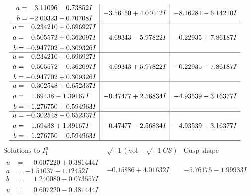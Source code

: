 \documentclass[1p]{elsarticle_modified}
\theoremstyle{definition}
\newcommand{\I}{\sqrt{-1}}
\begin{document}
$$\begin{array}{c|c|c}
\begin{aligned}
a &= \phantom{-}3.11096 - 0.73852 I \\
b &= -2.00323 - 0.70708 I\end{aligned}
 & -3.56160 + 4.04042 I & -8.16281 - 6.14210 I \\ \hline\begin{aligned}
u &= \phantom{-}0.234210 + 0.696927 I \\
a &= \phantom{-}0.505572 + 0.362097 I \\
b &= -0.947702 - 0.309326 I\end{aligned}
 & \phantom{-}4.69343 - 5.97822 I & -0.22935 + 7.86187 I \\ \hline\begin{aligned}
u &= \phantom{-}0.234210 - 0.696927 I \\
a &= \phantom{-}0.505572 - 0.362097 I \\
b &= -0.947702 + 0.309326 I\end{aligned}
 & \phantom{-}4.69343 + 5.97822 I & -0.22935 - 7.86187 I \\ \hline\begin{aligned}
u &= -0.302548 + 0.652337 I \\
a &= \phantom{-}1.69438 - 1.39167 I \\
b &= -1.276750 + 0.594963 I\end{aligned}
 & -0.47477 + 2.56834 I & -4.93539 - 3.16377 I \\ \hline\begin{aligned}
u &= -0.302548 - 0.652337 I \\
a &= \phantom{-}1.69438 + 1.39167 I \\
b &= -1.276750 - 0.594963 I\end{aligned}
 & -0.47477 - 2.56834 I & -4.93539 + 3.16377 I\\
 \hline 
 \end{array}$$\newpage$$\begin{array}{c|c|c}  
\text{Solutions to }I^u_{1}& \I (\text{vol} + \sqrt{-1}CS) & \text{Cusp shape}\\
 \hline 
\begin{aligned}
u &= \phantom{-}0.607220 + 0.381444 I \\
a &= -1.51037 - 1.12452 I \\
b &= \phantom{-}1.240080 - 0.073557 I\end{aligned}
 & -0.15886 + 4.01632 I & -5.76175 - 1.99933 I \\ \hline\begin{aligned}
u &= \phantom{-}0.607220 - 0.381444 I \\

\end{aligned}
\end{array}$$
\end{document}
